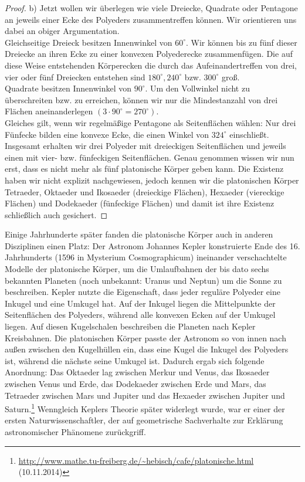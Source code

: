 \begin{proof}
b) Jetzt wollen wir überlegen wie viele Dreiecke, Quadrate oder Pentagone an jeweils einer Ecke des Polyeders zusammentreffen können. Wir orientieren uns dabei an obiger Argumentation.\\
Gleichseitige Dreieck besitzen Innenwinkel von $60^\circ$. Wir können bis zu fünf dieser Dreiecke an ihren Ecke zu einer konvexen Polyederecke zusammenfügen. Die auf diese Weise entstehenden Körperecken die durch das Aufeinandertreffen von drei, vier oder fünf Dreiecken entstehen sind  $180^\circ, 240^\circ$ bzw. $300^\circ$ groß.\\
Quadrate besitzen Innenwinkel von $90^\circ$. Um den Vollwinkel nicht zu überschreiten bzw. zu erreichen, können wir nur die Mindestanzahl von drei Flächen aneinanderlegen $(3\cdot90^\circ=270^\circ)$.\\
Gleiches gilt, wenn wir regelmäßige Pentagone als Seitenflächen wählen: Nur drei Fünfecke bilden eine konvexe Ecke, die einen Winkel von $324^\circ$ einschließt.\\
Insgesamt erhalten wir drei Polyeder mit dreieckigen Seitenflächen und jeweils einen mit vier- bzw. fünfeckigen Seitenflächen. Genau genommen wissen wir nun erst, dass es nicht mehr als fünf platonische Körper geben kann. Die Existenz haben wir nicht explizit nachgewiesen, jedoch kennen wir die platonischen Körper Tetraeder, Oktaeder und  Ikosaeder (dreieckige Flächen), Hexaeder (viereckige Flächen) und Dodekaeder (fünfeckige Flächen) und damit ist ihre Existenz schließlich auch gesichert. 
\end{proof}
Einige Jahrhunderte später fanden die platonische Körper auch in anderen Disziplinen einen Platz: 
Der Astronom Johannes Kepler konstruierte Ende des 16. Jahrhunderts (1596 in Mysterium Cosmographicum) ineinander verschachtelte Modelle der platonische Körper, um die Umlaufbahnen der bis dato sechs bekannten Planeten (noch unbekannt: Uranus und Neptun) um die Sonne zu beschreiben. Kepler nutzte die Eigenschaft, dass jeder reguläre Polyeder eine Inkugel und eine Umkugel hat. Auf der Inkugel liegen die Mittelpunkte der Seitenflächen des Polyeders, während alle konvexen Ecken auf der Umkugel liegen. Auf diesen Kugelschalen beschreiben die Planeten nach Kepler Kreisbahnen. Die platonischen Körper passte der Astronom so von innen nach außen zwischen den Kugelhüllen ein, dass eine Kugel die Inkugel des Polyeders ist, während die nächste seine Umkugel ist. Dadurch ergab sich folgende Anordnung: Das Oktaeder lag zwischen Merkur und Venus, das Ikosaeder zwischen Venus und Erde, das Dodekaeder zwischen Erde und Mars, das Tetraeder zwischen Mars und Jupiter und das Hexaeder zwischen Jupiter und Saturn.\footnote{\url{http://www.mathe.tu-freiberg.de/~hebisch/cafe/platonische.html} (10.11.2014)}  Wenngleich Keplers Theorie später widerlegt wurde, war er einer der ersten Naturwissenschaftler, der auf geometrische Sachverhalte zur Erklärung astronomischer Phänomene zurückgriff.\\
